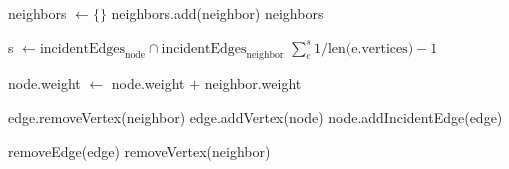 \documentclass{article}
\begin{document}
\begin{algorithm}
\caption{functions}
\begin{algorithmic}

        \State neighbors $\gets \{\}$
                \Statex
                        \State neighbors.add(neighbor)
                    \EndIf
                \EndFor
                \Statex
            \EndIf
        \EndFor
        \Statex
        \State \Return neighbors
    \EndFunction
    \Statex

        \State s $\gets \text{incidentEdges}_\text{node} \cap \text{incidentEdges}_\text{neighbor}$
        \State \Return $\sum_{e}^{s}{1/\text{len(e.vertices)} - 1}$
    \EndFunction
    \Statex

       \State node.weight $\gets$ node.weight $+$ neighbor.weight

            \State edge.removeVertex(neighbor)
                \State edge.addVertex(node)
                \State node.addIncidentEdge(edge)
            \EndIf
            \Statex

                \State removeEdge(edge)
            \EndIf
       \EndFor
        \State removeVertex(neighbor)
    \EndFunction

\end{algorithmic}
\end{algorithm}




\newpage
\end{document}
